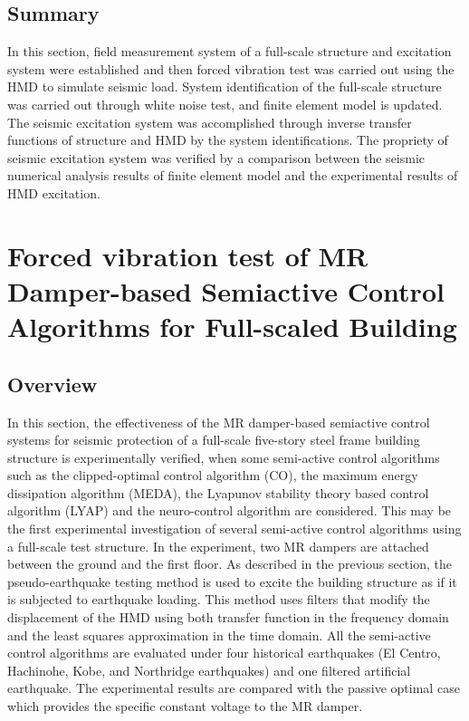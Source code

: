 \subsection{Summary}
In this section, field measurement system of a full-scale structure and excitation system were established and then forced vibration test was carried out using the HMD to simulate seismic load. System identification of the full-scale structure was carried out through white noise test, and finite element model is updated. The seismic excitation system was accomplished through inverse transfer functions of structure and HMD by the system identifications. The propriety of seismic excitation system was verified by a comparison between the seismic numerical analysis results of finite element model and the experimental results of HMD excitation.



\section{Forced vibration test of MR Damper-based Semiactive Control Algorithms for Full-scaled Building}
\label{chap:expmr}
\subsection{Overview}

In this section, the effectiveness of the MR damper-based semiactive control systems for seismic protection of a full-scale five-story steel frame building structure is experimentally verified, when some semi-active control algorithms such as the clipped-optimal control algorithm (CO), the maximum energy dissipation algorithm (MEDA), the Lyapunov stability theory based control algorithm (LYAP) and the neuro-control algorithm are considered. This may be the first experimental investigation of several semi-active control algorithms using a full-scale test structure. In the experiment, two MR dampers are attached between the ground and the first floor. As described in the previous section, the pseudo-earthquake testing method is used to excite the building structure as if it is subjected to earthquake loading. This method uses filters that modify the displacement of the HMD using both transfer function in the frequency domain and the least squares approximation in the time domain. All the semi-active control algorithms are evaluated under four historical earthquakes (El Centro, Hachinohe, Kobe, and Northridge earthquakes) and one filtered artificial earthquake. The experimental results are compared with the passive optimal case which provides the specific constant voltage to the MR damper.


